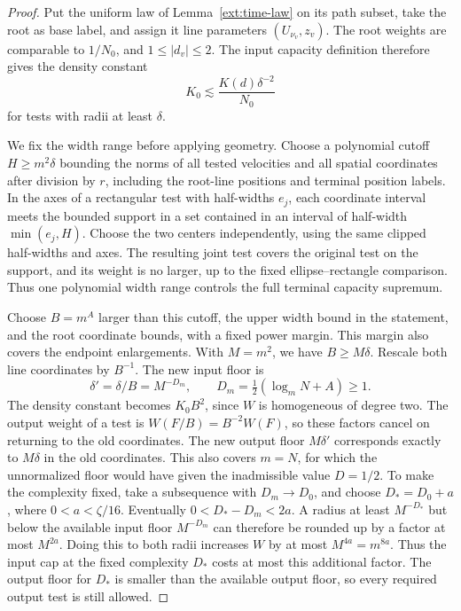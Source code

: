 \begin{proof}
Put the uniform law of Lemma~\ref{ext:time-law} on its path
subset, take the root as base label, and assign it line parameters
\((U_{\nu_v},z_v)\). The root weights are comparable to \(1/N_0\),
and \(1\leq|d_v|\leq2\). The input capacity definition therefore
gives the density constant
\[
                         K_0\lesssim
                         \frac{K(d)\delta^{-2}}{N_0}
\]
for tests with radii at least \(\delta\).

We fix the width range before applying geometry. Choose a polynomial
cutoff \(H\geq m^2\delta\) bounding the norms of all tested velocities
and all spatial coordinates after division by \(r\), including
the root-line positions and terminal position labels. In the axes of
a rectangular test with half-widths \(e_j\), each coordinate interval
meets the bounded support in a set contained in an interval of
half-width \(\min(e_j,H)\). Choose the two centers independently,
using the same clipped half-widths and axes. The resulting joint test
covers the original test on the support, and its weight is no larger,
up to the fixed ellipse--rectangle comparison. Thus one polynomial
width range controls the full terminal capacity supremum.

Choose \(B=m^A\) larger than this cutoff, the upper width bound in
the statement, and the root coordinate bounds, with a fixed power
margin. This margin also covers the endpoint enlargements. With
\(M=m^2\), we have \(B\geq M\delta\). Rescale both line coordinates
by \(B^{-1}\).
The new input floor is
\[
 \delta'=\delta/B=M^{-D_m},\qquad
 D_m=\tfrac12(\log_mN+A)\geq1.
\]
The density constant becomes \(K_0B^2\), since \(W\) is
homogeneous of degree two. The output weight of a test is
\(W(F/B)=B^{-2}W(F)\), so these factors cancel on returning
to the old coordinates. The new output floor \(M\delta'\)
corresponds exactly to \(M\delta\) in the old coordinates.
This also covers \(m=N\), for which the unnormalized floor
would have given the inadmissible value \(D=1/2\).
To make the complexity fixed, take a subsequence with
\(D_m\to D_0\), and choose \(D_*=D_0+a\), where
\(0<a<\zeta/16\). Eventually
\(0<D_*-D_m<2a\). A radius at least \(M^{-D_*}\) but below
the available input floor \(M^{-D_m}\) can therefore be
rounded up by a factor at most \(M^{2a}\). Doing this to
both radii increases \(W\) by at most \(M^{4a}=m^{8a}\).
Thus the input cap at the fixed complexity \(D_*\) costs
at most this additional factor. The output floor for \(D_*\)
is smaller than the available output floor, so every required
output test is still allowed.


\end{proof}
